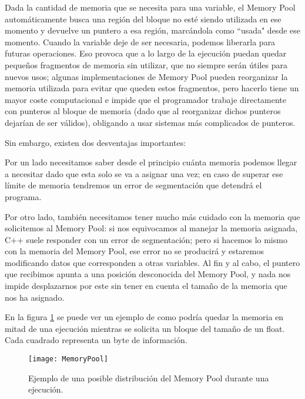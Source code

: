 Dada la cantidad de memoria que se necesita para una variable, el Memory Pool automáticamente busca una región del bloque no esté siendo utilizada en ese momento y devuelve un puntero a esa región, marcándola como ``usada" desde ese momento. Cuando la variable deje de ser necesaria, podemos liberarla para futuras operaciones. Eso provoca que a lo largo de la ejecución puedan quedar pequeños fragmentos de memoria sin utilizar, que no siempre serán útiles para nuevos usos; algunas implementaciones de Memory Pool pueden reorganizar la memoria utilizada para evitar que queden estos fragmentos, pero hacerlo tiene un mayor coste computacional e impide que el programador trabaje directamente con punteros al bloque de memoria (dado que al reorganizar dichos punteros dejarían de ser válidos), obligando a usar sistemas más complicados de punteros.

Sin embargo, existen dos desventajas importantes:

Por un lado necesitamos saber desde el principio cuánta memoria podemos llegar a necesitar dado que esta solo se va a asignar una vez; en caso de superar ese límite de memoria tendremos un error de segmentación que detendrá el programa.

Por otro lado, también necesitamos tener mucho más cuidado con la memoria que solicitemos al Memory Pool: si nos equivocamos al manejar la memoria asignada, C++ suele responder con un error de segmentación; pero si hacemos lo mismo con la memoria del Memory Pool, ese error no se producirá y estaremos modificando datos que corresponden a otras variables. Al fin y al cabo, el puntero que recibimos apunta a una posición desconocida del Memory Pool, y nada nos impide desplazarnos por este sin tener en cuenta el tamaño de la memoria que nos ha asignado.

En la figura \ref{fig:memory_pool} se puede ver un ejemplo de como podría quedar la memoria en mitad de una ejecución mientras se solicita un bloque del tamaño de un float. Cada cuadrado representa un byte de información.

\begin{figure}[H]
    \centering
    \texttt{[image: MemoryPool]}
    \caption{Ejemplo de una posible distribución del Memory Pool durante una ejecución.}
    \label{fig:memory_pool}
\end{figure}